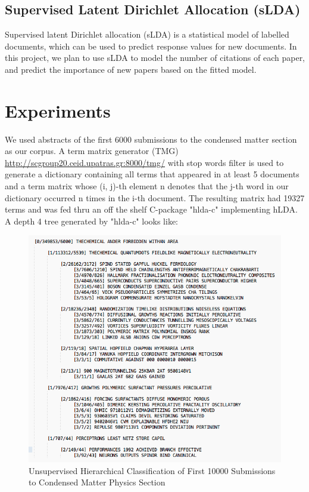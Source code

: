 \documentclass[DIV=calc, paper=a4, fontsize=11pt, twocolumn]{scrartcl}	 %
\begin{document}
\subsection*{Supervised Latent Dirichlet Allocation (sLDA)}
Supervised latent Dirichlet allocation (sLDA) is a statistical model of labelled documents, which can be used to predict response values for new documents. In this project, we plan to use sLDA to model the number of citations of each paper, and predict the importance of new papers based on the fitted model.
\section*{Experiments}

We used abstracts of the first 6000 submissions to the condensed matter section as our corpus. A term matrix generator (TMG) \url{http://scgroup20.ceid.upatras.gr:8000/tmg/} with stop words filter is used to generate a dictionary containing all terms that appeared in at least 5 documents and a term matrix whose (i, j)-th element n denotes that the j-th word in our dictionary occurred n times in the i-th document. The resulting matrix had 19327 terms and was fed thru an off the shelf C-package "hlda-c" \cite{1} implementing hLDA.\\
A depth 4 tree generated by "hlda-c" looks like:\newline
			\begin{figure}[!ht]
				\centerline{\includegraphics[scale = 0.35]{tree10000.png}}
				\caption{Unsupervised Hierarchical Classification of First 10000 Submissions to Condensed Matter Physics Section}
			\end{figure}
\end{document}
